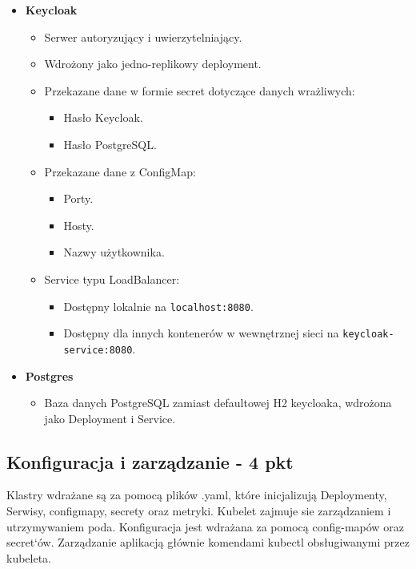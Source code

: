 \documentclass[12pt,a4paper]{article}
\begin{document}
\begin{itemize}
    \item \textbf{Keycloak}
    \begin{itemize}
        \item Serwer autoryzujący i uwierzytelniający.
        \item Wdrożony jako jedno-replikowy deployment.
        \item Przekazane dane w formie secret dotyczące danych wrażliwych:
        \begin{itemize}
            \item Hasło Keycloak.
            \item Hasło PostgreSQL.
        \end{itemize}
        \item Przekazane dane z ConfigMap:
        \begin{itemize}
            \item Porty.
            \item Hosty.
            \item Nazwy użytkownika.
        \end{itemize}
        \item Service typu LoadBalancer:
        \begin{itemize}
            \item Dostępny lokalnie na \texttt{localhost:8080}.
            \item Dostępny dla innych kontenerów w wewnętrznej sieci na \texttt{keycloak-service:8080}.
        \end{itemize}
    \end{itemize}
    
    \item \textbf{Postgres}
    \begin{itemize}
        \item Baza danych PostgreSQL zamiast defaultowej H2 keycloaka, wdrożona jako Deployment i Service.
    \end{itemize}
\end{itemize}


\subsection{Konfiguracja i zarządzanie - 4 pkt}
\label{sec:NonFunctionalConditions}

Klastry wdrażane są za pomocą plików .yaml, które inicjalizują Deploymenty, Serwisy, configmapy, secrety oraz metryki. Kubelet zajmuje sie zarządzaniem i utrzymywaniem poda. Konfiguracja jest wdrażana za pomocą config-mapów oraz secret`ów. Zarządzanie aplikacją głównie komendami kubectl obsługiwanymi przez kubeleta.
\end{document}
